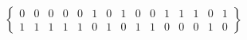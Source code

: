 \setcounter{MaxMatrixCols}{15} %
\[  \begin{Bmatrix}
0 & 0 & 0 & 0 & 0 & 1 & 0 & 1 & 0 & 0 & 1 & 1 & 1 & 0 & 1\\
1 & 1 & 1 & 1 & 1 & 0 & 1 & 0 & 1 & 1 & 0 & 0 & 0 & 1 & 0
\end{Bmatrix}  \]
